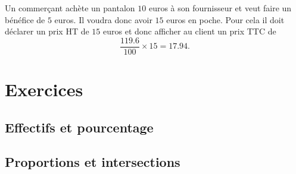 \begin{example}
    Un commerçant achète un pantalon \( 10\) euros à son fournisseur et veut faire un bénéfice de \( 5\) euros. Il voudra donc avoir \( 15\) euros en poche. Pour cela il doit déclarer un prix HT de \( 15\) euros et donc afficher au client un prix TTC de
    \begin{equation}
        \frac{ 119.6 }{ 100 }\times 15=17.94.
    \end{equation}
\end{example}

\section{Exercices}

\subsection{Effectifs et pourcentage}


\subsection{Proportions et intersections}



